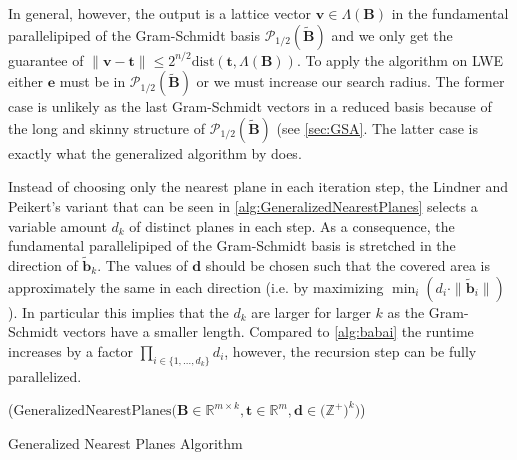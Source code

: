 In general, however, the output is a lattice vector $\mathbf{v} \in \Lambda(\mathbf{B})$ in the fundamental parallelipiped of the Gram-Schmidt basis $\mathcal{P}_{1/2}(\tilde{\mathbf{B}})$ and we only get the guarantee of $\|\mathbf{v} - \mathbf{t}\| \leq 2^{n/2} \text{dist}(\mathbf{t}, \Lambda(\mathbf{B}))$. To apply the algorithm on LWE either $\mathbf{e}$ must be in $\mathcal{P}_{1/2}(\tilde{\mathbf{B}})$ or we must increase our search radius. The former case is unlikely as the last Gram-Schmidt vectors in a reduced basis because of the long and skinny structure of $\mathcal{P}_{1/2}(\tilde{\mathbf{B}})$ (see \cref{sec:GSA}. The latter case is exactly what the generalized algorithm by \cite{LP11} does.

Instead of choosing only the nearest plane in each iteration step, the Lindner and Peikert's variant that can be seen in \cref{alg:GeneralizedNearestPlanes} selects a variable amount $d_k$ of distinct planes in each step. As a consequence, the fundamental parallelipiped of the Gram-Schmidt basis is stretched in the direction of $\tilde{\mathbf{b}}_k$. The values of $\mathbf{d}$ should be chosen such that the covered area is approximately the same in each direction (i.e. by maximizing $\min_i(d_i \cdot \|\tilde{\mathbf{b}}_i\|)$). In particular this implies that the $d_k$ are larger for larger $k$ as the Gram-Schmidt vectors have a smaller length. %
Compared to \cref{alg:babai} the runtime increases by a factor $\prod_{i \in \{1, \dots, d_k\}} d_i$, however, the recursion step can be fully parallelized.

\begin{algorithm2e}
  \Begin($\text{GeneralizedNearestPlanes} {(} \mathbf{B} \in \mathbb{R}^{m \times k},\mathbf{t} \in \mathbb{R}^{m}, \mathbf{d} \in {(}\mathbb{Z}^+{)}^k {)}$)
    { %
  }
  \caption[Generalized Nearest Planes Algorithm]{Generalized Nearest Planes Algorithm \cite{LP11}}\label{alg:GeneralizedNearestPlanes}
\end{algorithm2e}

